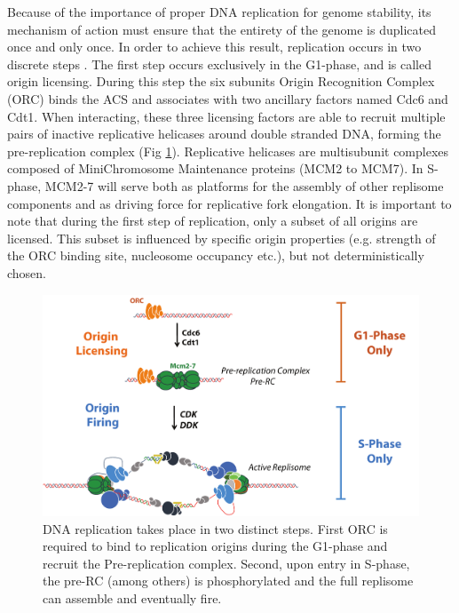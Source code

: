 Because of the importance of proper DNA replication for genome stability, its mechanism of action must ensure that the entirety of the genome is duplicated once and only once. 
In order to achieve this result, replication occurs in two discrete steps \cite{diffley:1994:two}.
The first step occurs exclusively in the G1-phase, and is called origin licensing.
During this step the six subunits Origin Recognition Complex (ORC) binds the ACS and associates with two ancillary factors named Cdc6 and Cdt1. 
When interacting, these three licensing factors are able to recruit multiple pairs of inactive replicative helicases around double stranded DNA, forming the pre-replication complex (Fig \ref{fig:repSteps})\cite{gambus:2011:mcm27, remus:2009:concerted, seki:2000:stepwise, rowles:1999:changes, donovan:1997:cdc6pdependent}.
Replicative helicases are multisubunit complexes composed of MiniChromosome Maintenance proteins (MCM2 to MCM7). 
In S-phase, MCM2-7 will serve both as platforms for the assembly of other replisome components and as driving force for replicative fork elongation. 
It is important to note that during the first step of replication, only a subset of all origins are licensed. This subset is influenced by specific origin properties (e.g. strength of the ORC binding site, nucleosome occupancy etc.), but not deterministically chosen.

\begin{figure}[ht]

\centering
\includegraphics[width=\textwidth]{figures/introduction/repSteps}
\caption[Stepwise mechanism of DNA replication]{DNA replication takes place in two distinct steps. First ORC is required to bind to replication origins during the G1-phase and recruit the Pre-replication complex. Second, upon entry in S-phase, the pre-RC (among others) is phosphorylated and the full replisome can assemble and eventually fire.}
\label{fig:repSteps}

\end{figure}

